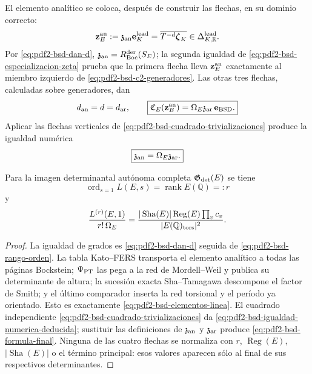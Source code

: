 El elemento analítico se coloca, después de construir las flechas, en su
dominio correcto:
\begin{equation}\label{eq:pdf2-bsd-elemento-analitico-tipado}
 \mathbf z_E^{\rm an}:=\mathfrak z_{\rm an}\mathbf e_K^{\rm lead}
 =\overline{T^{-d}\boldsymbol\zeta_K}
 \in\Delta_{K,\mathbb R}^{\rm lead}.
\end{equation}
Por \eqref{eq:pdf2-bsd-dan-d},
$\mathfrak z_{\rm an}=R_{\rm Boc}^{\rm der}(S_E)$; la segunda igualdad de
\eqref{eq:pdf2-bsd-especializacion-zeta} prueba que la primera flecha lleva
$\mathbf z_E^{\rm an}$ exactamente al miembro izquierdo de
\eqref{eq:pdf2-bsd-c2-generadores}. Las otras tres flechas, calculadas sobre
generadores, dan
\begin{equation}\label{eq:pdf2-bsd-elementos-linea}
 d_{\rm an}=d=d_{\rm ar},
 \qquad
 \boxed{
 \mathfrak C_E(\mathbf z_E^{\rm an})
 =\Omega_E\mathfrak z_{\rm ar}\,\mathbf e_{\rm BSD}.}
\end{equation}
Aplicar las flechas verticales de
\eqref{eq:pdf2-bsd-cuadrado-trivializaciones} produce la igualdad numérica
\begin{equation}\label{eq:pdf2-bsd-igualdad-numerica-deducida}
 \boxed{\mathfrak z_{\rm an}=\Omega_E\mathfrak z_{\rm ar}.}
\end{equation}

\begin{theorem}
\label{thm:pdf2-bsd-publicacion-final}
Para la imagen determinantal autónoma completa
$\mathfrak G_{\rm det}(E)$ se tiene
\begin{equation}\label{eq:pdf2-bsd-rango-final}
 \operatorname{ord}_{s=1}L(E,s)=\operatorname{rank}E(\mathbb Q)=:r
\end{equation}
y
\begin{equation}\label{eq:pdf2-bsd-formula-final}
 \frac{L^{(r)}(E,1)}{r!\,\Omega_E}
 =\frac{|\operatorname{Sha}(E)|\operatorname{Reg}(E)\prod_vc_v}
 {|E(\mathbb Q)_{\rm tors}|^2}.
\end{equation}
\end{theorem}

\begin{proof}
La igualdad de grados es
\eqref{eq:pdf2-bsd-dan-d} seguida de
\eqref{eq:pdf2-bsd-rango-orden}. La tabla Kato--FERS transporta el elemento
analítico a todas las páginas Bockstein; $\Psi_{\rm PT}$ las pega a la red
de Mordell--Weil y publica su determinante de altura; la sucesión exacta
Sha--Tamagawa descompone el factor de Smith; y el último comparador inserta
la red torsional y el período ya orientado. Esto es exactamente
\eqref{eq:pdf2-bsd-elementos-linea}. El cuadrado independiente
\eqref{eq:pdf2-bsd-cuadrado-trivializaciones} da
\eqref{eq:pdf2-bsd-igualdad-numerica-deducida}; sustituir las definiciones de
$\mathfrak z_{\rm an}$ y $\mathfrak z_{\rm ar}$ produce
\eqref{eq:pdf2-bsd-formula-final}. Ninguna de las cuatro flechas se
normaliza con $r$, $\operatorname{Reg}(E)$,
$|\operatorname{Sha}(E)|$ o el término principal: esos valores aparecen
sólo al final de sus respectivos determinantes.
\end{proof}

